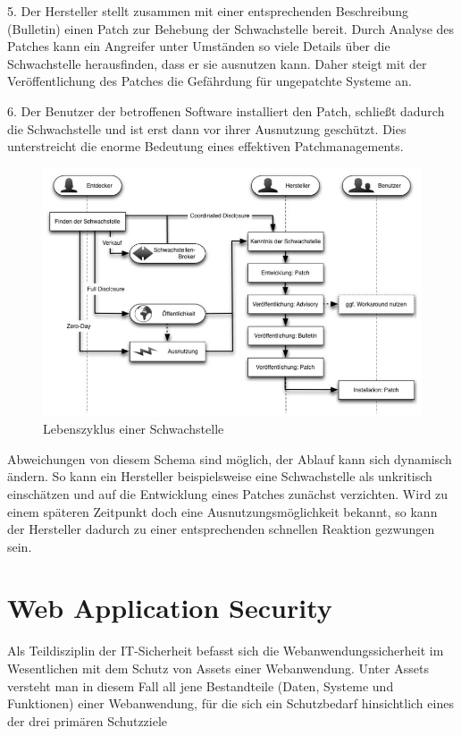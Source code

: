 \documentclass[12pt,oneside,a4paper,parskip]{scrbook}
\begin{document}
  5. Der Hersteller stellt zusammen mit einer entsprechenden Beschreibung (Bulletin) einen
  Patch zur Behebung der Schwachstelle bereit. Durch Analyse des Patches kann ein Angreifer
  unter Umständen so viele Details über die Schwachstelle herausfinden, dass er sie ausnutzen
  kann. Daher steigt mit der Veröffentlichung des Patches die Gefährdung für ungepatchte
  Systeme an.

  6. Der Benutzer der betroffenen Software installiert den Patch, schließt dadurch die Schwachstelle und ist erst dann vor ihrer Ausnutzung geschützt. Dies unterstreicht die enorme Bedeutung eines effektiven Patchmanagements.
  \begin{figure}[htb!]
    \centering
     \includegraphics[width=1\textwidth]{Images/Lebenszyklus}
    \caption[Lebenszyklus einer Schwachstelle]{Lebenszyklus einer Schwachstelle \cite{BSI3}}
  \end{figure}

  Abweichungen von diesem Schema sind möglich, der Ablauf kann sich dynamisch ändern. So
  kann ein Hersteller beispielsweise eine Schwachstelle als unkritisch einschätzen und auf die
  Entwicklung eines Patches zunächst verzichten. Wird zu einem späteren Zeitpunkt doch eine
  Ausnutzungsmöglichkeit bekannt, so kann der Hersteller dadurch zu einer entsprechenden
  schnellen Reaktion gezwungen sein. \cite{BSI3}

  \section{Web Application Security}
  Als Teildisziplin der IT-Sicherheit befasst sich die Webanwendungssicherheit im Wesentlichen mit dem
  Schutz von Assets einer Webanwendung. Unter Assets versteht man in diesem Fall all jene Bestandteile
  (Daten, Systeme und Funktionen) einer Webanwendung, für die sich ein Schutzbedarf hinsichtlich eines der
  drei primären Schutzziele
\end{document}
